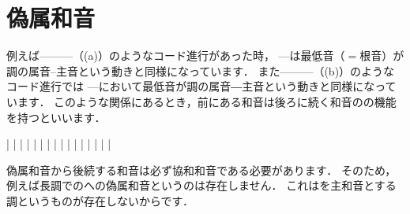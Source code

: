 \documentclass[dvipdfmx,uplatex,b5paper,openany,jbase=12Q,nomag*,textwidth-limit=44%
               ]{gachimuchi}
\begin{document}
\section{偽属和音}
例えば\Gni---\Gnii\Min---\Gnv---\Gni （(a)）のようなコード進行があった時，
\Gnii\Min---\Gnv は最低音（$=$根音）が\Gnv 調の属音--主音という動きと同様になっています．
また\Gni---\Gniv---\Gnv---\Gni （(b)）のようなコード進行では
\Gni---\Gniv において最低音が\Gniv 調の属音―主音という動きと同様になっています．
このような関係にあるとき，前にある和音は後ろに続く和音のの機能を持つといいます．%

\begin{floatMusic}[pos=ht]
  \Startpiece%
  \znotes|\en
  \NOTEs
  \zchordsl{\Gni}%
  |%
  \en\bar
  \NOTEs
  \zchordsl{\Gnii\Min}%
  |%
  \en\bar
  \NOTEs
  \zchordsl{\Gnv}%
  |%
  \en\bar
  \NOTEs
  \zchordsl{\Gni}%
  |%
  \en\doublebar
  \znotes|\en
  \NOTEs
  \zchordsl{\Gni}%
  |%
  \en\bar
  \NOTEs
  \zchordsl{\Gniv}%
  |%
  \en\bar
  \NOTEs
  \zchordsl{\Gnv}%
  |%
  \en\bar
  \NOTEs
  \zchordsl{\Gni}%
  |%
  \en\setdoublebar
  \endpiece%
\end{floatMusic}

偽属和音から後続する和音は必ず協和和音である必要があります．
そのため，例えば長調での\Gnvii\Dimt への偽属和音というのは存在しません．
これは\Gnvii\Dimt を主和音とする調というものが存在しないからです．

\end{document}
